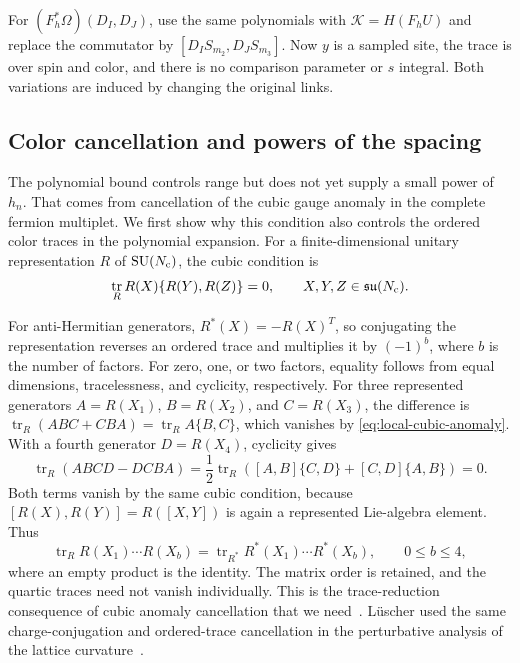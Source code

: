 \documentclass[11pt,a4paper]{article}
\theoremstyle{remark}
\DeclareMathOperator{\tr}{tr}
\DeclareMathOperator{\SU}{SU}
\begin{document}
For $(F_h^*\Omega)(D_I,D_J)$, use the same polynomials with
$\mathcal K=H(F_hU)$ and replace the commutator by
$[D_IS_{m_2},D_JS_{m_3}]$. Now $y$ is a sampled site, the trace is
over spin and color, and there is no comparison parameter or $s$
integral. Both variations are induced by changing the original links.

\subsection{Color cancellation and powers of the spacing}

The polynomial bound controls range but does not yet supply a small
power of $h_n$. That comes from cancellation of the cubic gauge anomaly
in the complete fermion multiplet. We first show why this condition
also controls the ordered color traces in the polynomial expansion.
For a finite-dimensional unitary representation $R$ of $\SU(N_{\rm c})$,
the cubic condition is
\begin{equation}
 \tr_R R(X)\{R(Y),R(Z)\}=0,
 \qquad X,Y,Z\in\mathfrak{su}(N_{\rm c}).
 \label{eq:local-cubic-anomaly}
\end{equation}

For anti-Hermitian generators, $R^*(X)=-R(X)^T$, so conjugating the
representation reverses an ordered trace and multiplies it by $(-1)^b$,
where $b$ is the number of factors. For zero, one, or two factors,
equality follows from equal dimensions, tracelessness, and cyclicity,
respectively. For three represented generators $A=R(X_1)$,
$B=R(X_2)$, and $C=R(X_3)$, the difference is
$\tr_R(ABC+CBA)=\tr_R A\{B,C\}$, which vanishes by
\eqref{eq:local-cubic-anomaly}. With a fourth generator $D=R(X_4)$,
cyclicity gives
\begin{equation}
 \tr_R(ABCD-DCBA)
 =\frac12\tr_R\!\left([A,B]\{C,D\}+[C,D]\{A,B\}\right)=0.
\end{equation}
Both terms vanish by the same cubic condition, because
$[R(X),R(Y)]=R([X,Y])$ is again a represented Lie-algebra element.
Thus
\begin{equation}
 \tr_R R(X_1)\cdots R(X_b)
 =\tr_{R^*}R^*(X_1)\cdots R^*(X_b),
 \qquad 0\le b\le4,
 \label{gen:ordered-traces}
\end{equation}
where an empty product is the identity. The matrix order is retained,
and the quartic traces need not vanish individually. This is the
trace-reduction consequence of cubic anomaly cancellation that we
need~\cite[sec.~3]{vanRitbergenGroupTheory}. L\"uscher used the same charge-conjugation and ordered-trace cancellation in the perturbative analysis of the lattice curvature~\cite[secs.~4.1--4.2]{LuscherPerturbative}.
\end{document}
